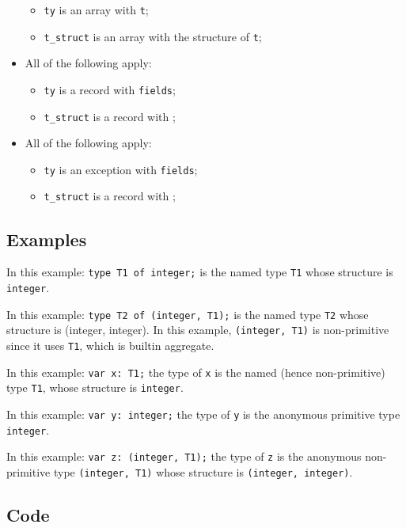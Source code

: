 \documentclass{book}
\begin{document}
\begin{itemize}
      \begin{itemize}
      \item \texttt{ty} is an array with \texttt{t};
      \item \texttt{t\_struct} is an array with the structure of \texttt{t};
      \end{itemize}
    \item All of the following apply:
      \begin{itemize}
      \item \texttt{ty} is a record with \texttt{fields};
      \item \texttt{t\_struct} is a record with ;
      \end{itemize}
    \item All of the following apply:
      \begin{itemize}
      \item \texttt{ty} is an exception with \texttt{fields};
      \item \texttt{t\_struct} is a record with ;
      \end{itemize}
    \end{itemize}
      
    \subsection{Examples}
    In this example:
    \texttt{type T1 of integer;} is the named type \texttt{T1}
whose structure is \texttt{integer}.

    In this example:
    \texttt{type T2 of (integer, T1);}
    is the named type \texttt{T2} whose structure is (integer, integer). In this
    example, \texttt{(integer, T1)} is non-primitive since it uses \texttt{T1}, which is builtin aggregate.

    In this example:
    \texttt{var x: T1;}
    the type of \texttt{x} is the named (hence non-primitive) type \texttt{T1}, whose structure
    is \texttt{integer}.

    In this example:
    \texttt{var y: integer;}
    the type of \texttt{y} is the anonymous primitive type \texttt{integer}.

    In this example:
    \texttt{var z: (integer, T1);}
    the type of \texttt{z} is the anonymous non-primitive type
\texttt{(integer, T1)} whose structure is \texttt{(integer, integer)}.

    \subsection{Code}
\end{document}
